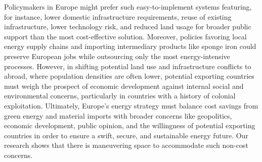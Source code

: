 Policymakers in Europe might prefer such easy-to-implement systems featuring,
for instance, lower domestic infrastructure requirements, reuse of existing
infrastructure, lower technology risk, and reduced land usage for broader public
support than the most cost-effective solution. Moreover, policies favoring local
energy supply chains and importing intermediary products like sponge iron could
preserve European jobs while outsourcing only the most energy-intensive
processes. However, in shifting potential land use and infrastructure conflicts
to abroad, where population densities are often lower, potential exporting
countries must weigh the prospect of economic development against internal
social and environmental concerns, particularly in countries with a history of
colonial exploitation.\cite{tunnGreenHydrogenTransitions2024} Ultimately,
Europe's energy strategy must balance cost savings from green energy and
material imports with broader concerns like geopolitics, economic development,
public opinion, and the willingness of potential exporting countries in order to
ensure a swift, secure, and sustainable energy future. Our research shows that
there is maneuvering space to accommodate such non-cost concerns.
